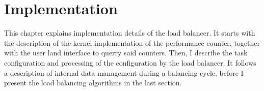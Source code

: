 \chapter{Implementation}
\label{sec:implementation}


This chapter explains implementation details of the load balancer.
It starts with the description of the kernel implementation of the performance
counter, together with the user land interface to querry said counters.
Then, I describe the task configuration and processing of the configuration by
the load balancer.
It follows a description of internal data management during a balancing cycle,
before I present the load balancing algorithms in the last section.







\cleardoublepage

